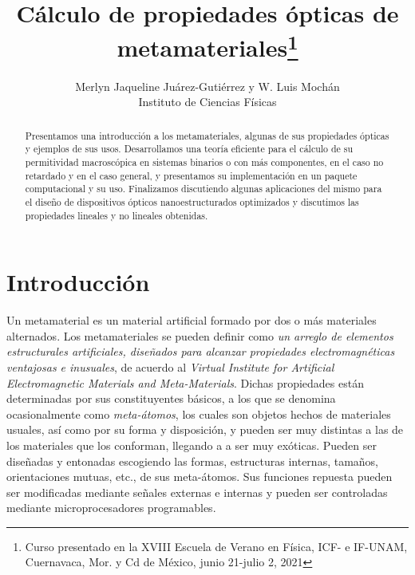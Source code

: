 \documentclass[12pt]{article}
\title{Cálculo de propiedades ópticas de metamateriales\footnote{Curso
    presentado en la XVIII Escuela de Verano en Física, ICF- e
    IF-UNAM, Cuernavaca, Mor. y Cd de México,
  junio 21-julio 2, 2021}}
\author{ Merlyn Jaqueline Juárez-Gutiérrez y W. Luis Mochán\\
  Instituto de Ciencias Físicas}
\begin{document}
\maketitle
\begin{abstract}
  Presentamos una introducción a los metamateriales, algunas de sus
  propiedades ópticas y ejemplos de sus usos. Desarrollamos una teoría
  eficiente para el cálculo de su permitividad macroscópica en
  sistemas binarios o con más componentes, en el caso no retardado y
  en el caso general, y presentamos su implementación en un paquete
  computacional y su uso. Finalizamos discutiendo algunas aplicaciones
  del mismo para el diseño de dispositivos ópticos nanoestructurados
  optimizados y discutimos las propiedades lineales y no lineales
  obtenidas.
\end{abstract}
\section{Introducción}

Un metamaterial es un material artificial formado por
dos o más materiales alternados. Los metamateriales se pueden definir como
{\em un arreglo de elementos estructurales artificiales, diseñados
  para alcanzar propiedades electromagnéticas ventajosas e
  inusuales}\cite{Metamorphose}, de acuerdo al
{\em Virtual Institute for Artificial Electromagnetic Materials and
  Meta-Materials}.
Dichas propiedades están
determinadas por sus constituyentes básicos, a los que se denomina
ocasionalmente como {\em meta-átomos}, los cuales son objetos hechos de
materiales usuales, así como por su forma y disposición, y pueden ser
muy distintas a las de los materiales que los conforman, llegando a
a ser muy exóticas. Pueden ser diseñadas y entonadas escogiendo las formas,
estructuras internas, tamaños, orientaciones mutuas, etc., de sus
meta-átomos.  Sus funciones repuesta pueden ser
modificadas mediante señales externas e internas y pueden ser
controladas mediante microprocesadores
programables.\cite{IntroductiontoMetamaterialsandNanophotonics}
\end{document}
